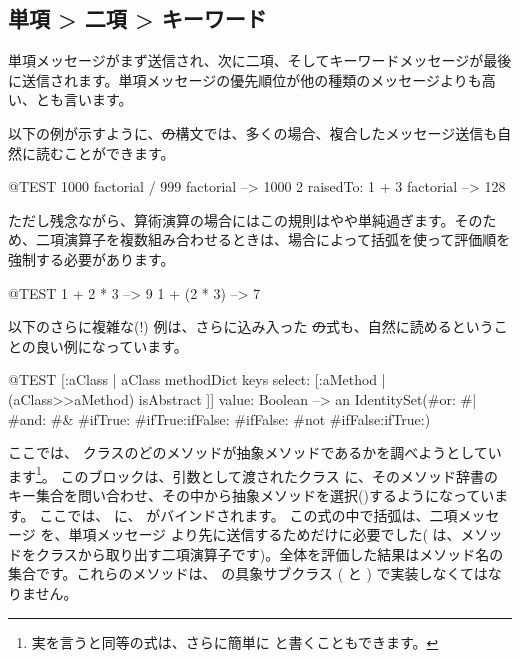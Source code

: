 \documentclass[a4paper,10pt,twoside]{book}
\begin{document}
\subsection*{単項 > 二項 > キーワード}
単項メッセージがまず送信され、次に二項、そしてキーワードメッセージが最後に送信されます。単項メッセージの優先順位が他の種類のメッセージよりも高い、とも言います。


以下の例が示すように、\st の構文では、多くの場合、複合したメッセージ送信も自然に読むことができます。
\begin{code}{@TEST}
1000 factorial / 999 factorial --> 1000
2 raisedTo: 1 + 3 factorial     --> 128
\end{code}
\noindent

ただし残念ながら、算術演算の場合にはこの規則はやや単純過ぎます。そのため、二項演算子を複数組み合わせるときは、場合によって括弧を使って評価順を強制する必要があります。
\begin{code}{@TEST}
1 + 2 * 3   --> 9
1 + (2 * 3) --> 7
\end{code}

以下のさらに複雑な(!) 例は、さらに込み入った \st の式も、自然に読めるということの良い例になっています。
\begin{code}{@TEST}
[:aClass | aClass methodDict keys select: [:aMethod | (aClass>>aMethod) isAbstract ]] value: Boolean --> an IdentitySet(#or: #| #and: #& #ifTrue: #ifTrue:ifFalse: #ifFalse: #not #ifFalse:ifTrue:)
\end{code}
\noindent
ここでは、 クラスのどのメソッドが抽象メソッドであるかを調べようとしています\footnote{実を言うと同等の式は、さらに簡単に  と書くこともできます。}。
このブロックは、引数として渡されたクラス  に、そのメソッド辞書のキー集合を問い合わせ、その中から抽象メソッドを選択()するようになっています。
ここでは、 に、 がバインドされます。
この式の中で括弧は、二項メッセージ \ct{>>} を、単項メッセージ \mbox{} より先に送信するためだけに必要でした(\ct{>>} は、メソッドをクラスから取り出す二項演算子です)。全体を評価した結果はメソッド名の集合です。これらのメソッドは、 の具象サブクラス ( と ) で実装しなくてはなりません。
\end{document}
